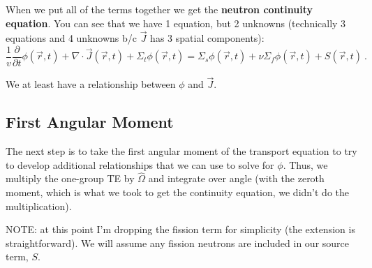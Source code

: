 \documentclass[12pt]{article}
\newlength{\up}
\newcommand{\vOmega}{\ensuremath{\hat{\Omega}}}
\begin{document}
\vspace*{2em}
When we put all of the terms together we get the \textbf{neutron continuity equation}. You can see that we have 1 equation, but 2 unknowns (technically 3 equations and 4 unknowns b/c $\vec{J}$ has 3 spatial components):
\begin{equation}
\frac{1}{v}\frac{\partial}{\partial t}\phi(\vec{r}, t) + 
\nabla \cdot \vec{J}(\vec{r}, t) + 
\Sigma_t \phi(\vec{r}, t) =
\Sigma_s \phi(\vec{r}, t) +
\nu \Sigma_f \phi(\vec{r}, t) +
S(\vec{r}, t)\:.
\label{eq:neutroncont}
\end{equation}

We at least have a relationship between $\phi$ and $\vec{J}$.

\subsection*{First Angular Moment}

The next step is to take the first angular moment of the transport equation to try to develop additional relationships that we can use to solve for $\phi$. Thus, we multiply the one-group TE by $\vOmega$ and integrate over angle (with the zeroth moment, which is what we took to get the continuity equation, we didn't do the multiplication). 

NOTE: at this point I'm dropping the fission term for simplicity (the extension is straightforward). We will assume any fission neutrons are included in our source term, $S$. 
\end{document}
